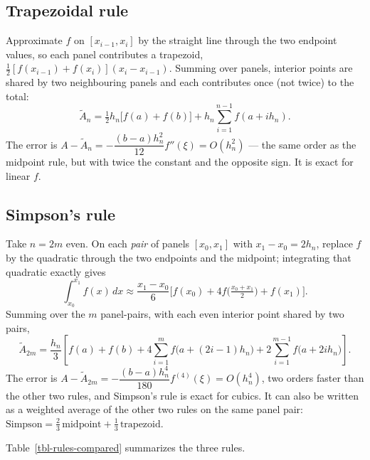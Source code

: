 \documentclass[
  letterpaper,
  DIV=11,
  numbers=noendperiod]{scrreprt}
\begin{document}
\subsection{Trapezoidal rule}\label{trapezoidal-rule}

Approximate \(f\) on \([x_{i-1},x_i]\) by the straight line through the
two endpoint values, so each panel contributes a trapezoid,
\(\tfrac12[f(x_{i-1})+f(x_i)](x_i-x_{i-1})\). Summing over panels,
interior points are shared by two neighbouring panels and each
contributes once (not twice) to the total: \[
\tilde A_n = \tfrac12 h_n\big[f(a) + f(b)\big] + h_n \sum_{i=1}^{n-1} f(a+ih_n).
\] The error is
\(A - \tilde A_n = -\dfrac{(b-a)h_n^2}{12}f''(\xi) = O(h_n^2)\) --- the
same order as the midpoint rule, but with twice the constant and the
opposite sign. It is exact for linear \(f\).

\subsection{Simpson's rule}\label{simpsons-rule}

Take \(n = 2m\) even. On each \emph{pair} of panels \([x_0,x_1]\) with
\(x_1-x_0=2h_n\), replace \(f\) by the quadratic through the two
endpoints and the midpoint; integrating that quadratic exactly gives \[
\int_{x_0}^{x_1} f(x)\,dx \approx \frac{x_1-x_0}{6}
\Big[f(x_0) + 4f\big(\tfrac{x_0+x_1}{2}\big) + f(x_1)\Big].
\] Summing over the \(m\) panel-pairs, with each even interior point
shared by two pairs, \[
\tilde A_{2m} = \frac{h_n}{3}\left[f(a) + f(b)
 + 4\sum_{i=1}^{m} f\big(a+(2i-1)h_n\big)
 + 2\sum_{i=1}^{m-1} f\big(a+2ih_n\big)\right].
\] The error is
\(A - \tilde A_{2m} = -\dfrac{(b-a)h_n^4}{180}f^{(4)}(\xi) =
O(h_n^4)\), two orders faster than the other two rules, and Simpson's
rule is exact for cubics. It can also be written as a weighted average
of the other two rules on the same panel pair:
\(\text{Simpson} = \tfrac23\,\text{midpoint} +
\tfrac13\,\text{trapezoid}\).

Table~\ref{tbl-rules-compared} summarizes the three rules.
\end{document}

